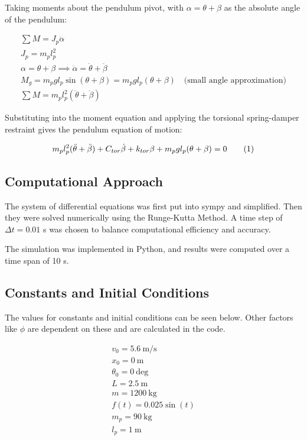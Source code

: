 Taking moments about the pendulum pivot, with $\alpha = \theta + \beta$ as the absolute angle of the pendulum:

\begin{gather*}
    \sum M = J_p \ddot{\alpha} \\
    J_p = m_p l_p^2 \\
    \alpha = \theta + \beta \implies \ddot{\alpha} = \ddot{\theta} + \ddot{\beta} \\
    M_g = m_p g l_p \sin(\theta + \beta) = m_p g l_p (\theta + \beta) \quad \text{(small angle approximation)} \\
    \sum M = m_p l_p^2 (\ddot{\theta} + \ddot{\beta})
\end{gather*}

Substituting into the moment equation and applying the torsional spring-damper restraint gives the pendulum equation of motion:

\begin{gather*}
    m_p l_p^2 (\ddot{\theta} + \ddot{\beta}) + C_{tor}\dot{\beta} + k_{tor}\beta + m_p g l_p (\theta + \beta) = 0 \numberthis \label{eq:pendulum_eq_motion}
\end{gather*}

\subsection{Computational Approach}

The system of differential equations was first put into sympy and simplified. Then they were solved numerically using the Runge-Kutta Method. A time step of $\Delta t = 0.01$ s was chosen to balance computational efficiency and accuracy.

The simulation was implemented in Python, and results were computed over a time span of 10 s.

\subsection{Constants and Initial Conditions}

The values for constants and initial conditions can be seen below. Other factors like $\phi$ are dependent on these and are calculated in the code.

\begin{gather*}
    v_0 = 5.6~\text{m/s} \\
    x_0 = 0~\text{m} \\
    \theta_0 = 0~\text{deg} \\
    L = 2.5~\text{m} \\
    m = 1200~\text{kg} \\
    f(t) = 0.025\sin(t) \\
    m_p = 90~\text{kg} \\
    l_p = 1~\text{m} \\
\end{gather*}

